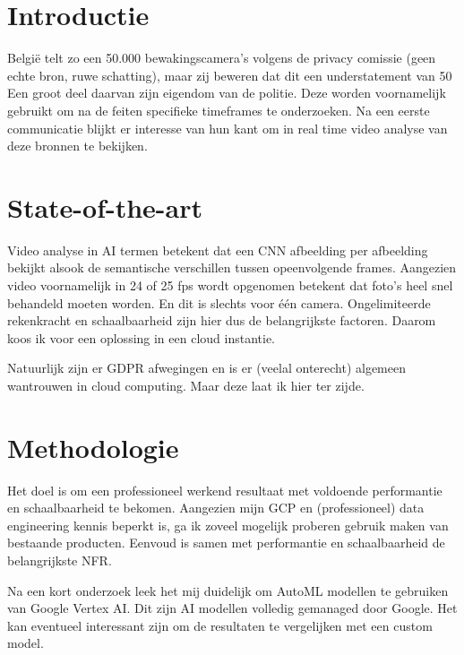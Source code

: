 
\section{Introductie}%
\label{sec:introductie}

België telt zo een 50.000 bewakingscamera's volgens de privacy comissie (geen echte bron, ruwe schatting), maar zij beweren dat dit een understatement van 50%
Een groot deel daarvan zijn eigendom van de politie. Deze worden voornamelijk gebruikt om na de feiten specifieke timeframes te onderzoeken.
Na een eerste communicatie blijkt er interesse van hun kant om in real time video analyse van deze bronnen te bekijken.

\section{State-of-the-art}%
\label{sec:state-of-the-art}

Video analyse in AI termen betekent dat een CNN afbeelding per afbeelding bekijkt alsook de semantische verschillen tussen opeenvolgende frames.
Aangezien video voornamelijk in 24 of 25 fps wordt opgenomen betekent dat foto's heel snel behandeld moeten worden. En dit is slechts voor één camera.
Ongelimiteerde rekenkracht en schaalbaarheid zijn hier dus de belangrijkste factoren. Daarom koos ik voor een oplossing in een cloud instantie.

Natuurlijk zijn er GDPR afwegingen en is er (veelal onterecht) algemeen wantrouwen in cloud computing. Maar deze laat ik hier ter zijde.

\section{Methodologie}%
\label{sec:methodologie}

Het doel is om een professioneel werkend resultaat met voldoende performantie en schaalbaarheid te bekomen. Aangezien mijn GCP en (professioneel) data engineering kennis beperkt is,
ga ik zoveel mogelijk proberen gebruik maken van bestaande producten. Eenvoud is samen met performantie en schaalbaarheid de belangrijkste NFR.

Na een kort onderzoek leek het mij duidelijk om AutoML modellen te gebruiken van Google Vertex AI. Dit zijn AI modellen volledig gemanaged door Google.
Het kan eventueel interessant zijn om de resultaten te vergelijken met een custom model.

